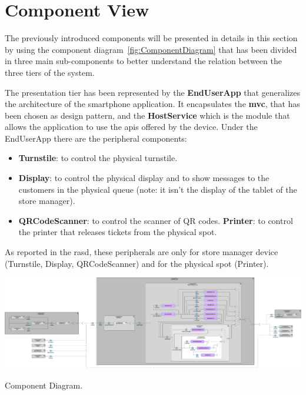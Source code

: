 \section{Component View}

The previously introduced components will be presented in details in this section by using the component diagram~\ref{fig:ComponentDiagram} that has been divided in three main sub-components to better understand the relation between the three tiers of the system.

The presentation tier has been represented by the \textbf{EndUserApp} that generalizes the architecture of the smartphone application.
It encapsulates the \textbf{\gls{mvc}}, that has been chosen as design pattern, and the \textbf{HostService} which is the module that allows the application to use the \glspl{api} offered by the device.
Under the EndUserApp there are the peripheral components:
\begin{itemize}
	\item \textbf{Turnstile}: to control the physical turnstile.
	\item \textbf{Display}: to control the physical display  and to show messages to the customers in the physical queue (note: it isn't the display of the tablet of the store manager).
	\item \textbf{QRCodeScanner}: to control the scanner of QR codes.
	\textbf{Printer}: to control the printer that releases tickets from the physical spot.
\end{itemize}
As reported in the \gls{rasd}, these peripherals are only for store manager device (Turnstile, Display, QRCodeScanner) and for the physical spot (Printer).

\begin{table} %
    \centering
    \includegraphics[width=1.0\textwidth]{images/component_diagram.pdf}
    \caption{Component Diagram.}\label{fig:ComponentDiagram}
\end{table} %

